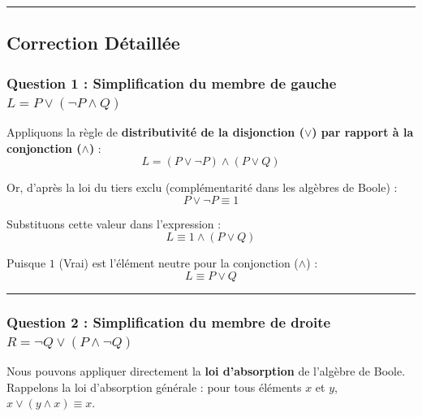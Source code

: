 \documentclass[11pt,a4paper]{article}
\begin{document}
\begin{center}\rule{0.5\linewidth}{0.5pt}\end{center}

\hypertarget{correction-duxe9tailluxe9e}{%
\subsection{Correction Détaillée}\label{correction-duxe9tailluxe9e}}

\hypertarget{question-1-simplification-du-membre-de-gauche-l-p-lor-neg-p-land-q}{%
\subsubsection{\texorpdfstring{Question 1 : Simplification du membre de
gauche
\(L = P \lor (\neg P \land Q)\)}{Question 1 : Simplification du membre de gauche L = P \textbackslash lor (\textbackslash neg P \textbackslash land Q)}}\label{question-1-simplification-du-membre-de-gauche-l-p-lor-neg-p-land-q}}

Appliquons la règle de \textbf{distributivité de la disjonction
(\(\lor\)) par rapport à la conjonction (\(\land\))} :
\[L = (P \lor \neg P) \land (P \lor Q)\]

Or, d'après la loi du tiers exclu (complémentarité dans les algèbres de
Boole) : \[P \lor \neg P \equiv 1\]

Substituons cette valeur dans l'expression :
\[L \equiv 1 \land (P \lor Q)\]

Puisque \(1\) (Vrai) est l'élément neutre pour la conjonction
(\(\land\)) : \[L \equiv P \lor Q\]

\begin{center}\rule{0.5\linewidth}{0.5pt}\end{center}

\hypertarget{question-2-simplification-du-membre-de-droite-r-neg-q-lor-p-land-neg-q}{%
\subsubsection{\texorpdfstring{Question 2 : Simplification du membre de
droite
\(R = \neg Q \lor (P \land \neg Q)\)}{Question 2 : Simplification du membre de droite R = \textbackslash neg Q \textbackslash lor (P \textbackslash land \textbackslash neg Q)}}\label{question-2-simplification-du-membre-de-droite-r-neg-q-lor-p-land-neg-q}}

Nous pouvons appliquer directement la \textbf{loi d'absorption} de
l'algèbre de Boole. Rappelons la loi d'absorption générale : pour tous
éléments \(x\) et \(y\), \(x \lor (y \land x) \equiv x\).
\end{document}

